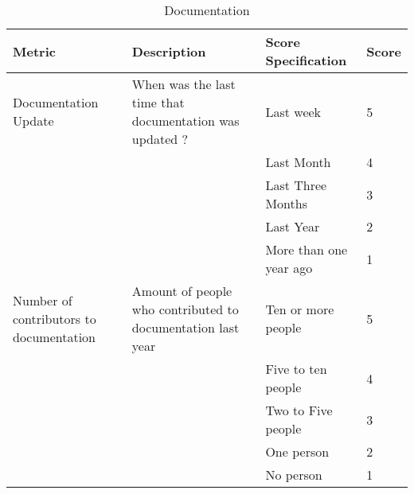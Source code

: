\documentclass[11pt]{article}
\begin{document}
\begin{table}[H]
  \begin{center}
    \begin{tabular}{ | p{3cm} | p{5cm} | p{3cm} | l | }
    \toprule
    \textbf{Metric} & \textbf{Description} & \textbf{Score Specification} & \textbf{Score} \\
    \hline
    Documentation Update & When was the last time that documentation was updated ? & Last week & 5 \\ \cline{3-3} \cline{4-4} 
    & & Last Month & 4 \\ \cline{3-3}\cline{4-4}
    & & Last Three Months & 3 \\ \cline{3-3}\cline{4-4}
    & & Last Year & 2 \\ \cline{3-3}\cline{4-4}
    & & More than one year ago & 1 \\ 
    \hline
    Number of contributors to documentation & Amount of people who contributed to documentation last year & Ten or more people & 5 \\ \cline{3-3} \cline{4-4} 
    & & Five to ten people & 4 \\ \cline{3-3}\cline{4-4}
    & & Two to Five people & 3 \\ \cline{3-3}\cline{4-4}
    & & One person & 2 \\ \cline{3-3}\cline{4-4}
    & & No person & 1 \\ 
    \bottomrule
    \end{tabular}
    \caption{Documentation}
    \label{tab:documentation}
  \end{center}
\end{table}
\end{document}

